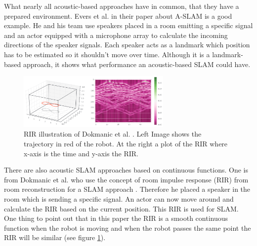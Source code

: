 What nearly all acoustic-based approaches have in common, that they have a prepared environment. Evers et al. in their paper about A-SLAM \cite{evers_aslam_2016} is a good example. He and his team use speakers placed in a room emitting a specific signal and an actor equipped with a microphone array to calculate the incoming directions of the speaker signals. Each speaker acts as a landmark which position has to be estimated so it shouldn't move over time. Although it is a landmark-based approach, it shows what performance an acoustic-based SLAM could have.

\begin{figure}[h!]
	\centering
	\captionsetup{justification=centering,margin=1cm}
	\includegraphics[width=0.666\textwidth]{images/acoustic_slam.png}
	\caption{
		RIR illustration of Dokmanic et al. \cite{dokmanic_roomrecslam_2016}. Left Image shows the trajectory in red of the robot. At the right a plot of the RIR where x-axis is the time and y-axis the RIR.
	}
	\label{fig:dokmanic_roomrecslam}
\end{figure}

There are also acoustic SLAM approaches based on continuous functions. One is from Dokmanic et al. who use the concept of room impulse response (RIR) from room reconstruction for a SLAM approach \cite{dokmanic_roomrecslam_2016}. Therefore he placed a speaker in the room which is sending a specific signal. An actor can now move around and calculate the RIR based on the current position. This RIR is used for SLAM. One thing to point out that in this paper the RIR is a smooth continuous function when the robot is moving and when the robot passes the same point the RIR will be similar (see figure \ref{fig:dokmanic_roomrecslam}).
